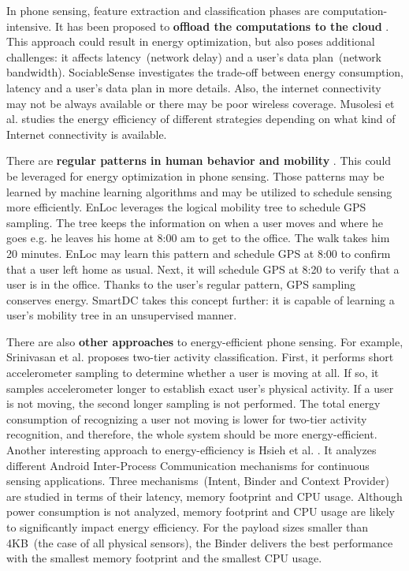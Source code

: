In phone sensing, feature extraction and classification phases are computation-intensive. It has been proposed to \textbf{offload the computations to the cloud} . This approach could result in energy optimization, but also poses additional challenges: it affects latency\ (network delay) and  a user's data plan\ (network bandwidth). SociableSense \cite{rachuri:socialsense} investigates the trade-off between energy consumption, latency and a user's data plan in more details. Also, the internet connectivity may not be always available or there may be poor wireless coverage. Musolesi et al. \cite{musolesi:offloading} studies the energy efficiency of different strategies depending on what kind of Internet connectivity is available. 

There are \textbf{regular patterns in human behavior and mobility} \cite{falaki:diversity} \cite{banerjee:batteries}. This could be leveraged for energy optimization in phone sensing. Those patterns may be learned by machine learning algorithms and may be utilized to schedule sensing more efficiently. EnLoc \cite{constandache:enloc} leverages the logical mobility tree to schedule GPS sampling. The tree keeps the information on when a user moves and where he goes e.g. he leaves his home at 8:00 am to get to the office. The walk takes him 20 minutes. EnLoc may learn this pattern and schedule GPS at 8:00 to confirm that a user left home as usual. Next, it will schedule GPS at 8:20 to verify that a user is in the office. Thanks to the user's regular pattern, GPS sampling conserves energy.  SmartDC \cite{chon:smartdc} takes this concept further: it is capable of learning a user's mobility tree in an unsupervised manner.

There are also \textbf{other approaches} to energy-efficient phone sensing. For example, Srinivasan et al. \cite{srinivasan:twotier} proposes two-tier activity classification. First, it performs short accelerometer sampling to determine whether a user is moving at all. If so, it samples accelerometer longer to establish exact user's physical activity. If a user is not moving, the second longer sampling is not performed. The total energy consumption of recognizing a user not moving is lower for two-tier activity recognition, and therefore, the whole system should be more energy-efficient. Another interesting approach to energy-efficiency is Hsieh et al. \cite{hsieh:ipc}. It analyzes different Android Inter-Process Communication mechanisms for continuous sensing applications. Three mechanisms\ (Intent, Binder and Context Provider) are studied in terms of their latency, memory footprint and CPU usage. Although power consumption is not analyzed, memory footprint and CPU usage are likely to significantly impact energy efficiency. For the payload sizes smaller than 4KB\ (the case of all physical sensors), the Binder delivers the best performance with the smallest memory footprint and the smallest CPU usage.

